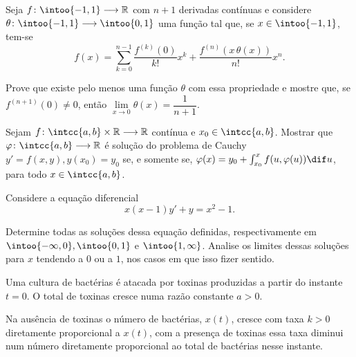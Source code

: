 \documentclass{IMTexam}
\begin{document}
\begin{questions}
\begin{parts}
\begin{solution}
                \hfill\qedsymbol
            \end{solution}
        \end{parts}

        \question Seja $f\colon \intoo{-1,1}\longrightarrow \mathbb{R}$ com
        $n+1$ derivadas contínuas e considere
        $\theta\colon\intoo{-1,1}\longrightarrow\intoo{0,1}$ uma função tal que,
        se $x\in\intoo{-1,1}$, tem-se
        \[ f(x)=\sum_{k=0}^{n-1}\dfrac{f^{(k)}(0)}{k!}x^k+\dfrac{f^{(n)}(x\,\theta(x))}{n!}x^n. \]

        Prove que existe pelo menos uma função $\theta$ com essa propriedade e
        mostre que, se $f^{(n+1)}(0)\neq 0$, então
        $\lim\limits_{x\to0}\theta(x)=\dfrac{1}{n+1}$.

        \begin{solution}
        \end{solution}

        \question Sejam $f\colon \intcc{a,b}\times\mathbb{R}\longrightarrow
        \mathbb{R}$ contínua e $x_0\in\intcc{a,b}$. Mostrar que
        $\varphi\colon\intcc{a,b}\longrightarrow\mathbb{R}$ é solução do
        problema de Cauchy $y'=f(x,y), y(x_0)=y_0$ se, e somente se,
        $\varphi(x)=y_0+\int_{x_0}^x f(u,\varphi(u))\dif u$, para todo
        $x\in\intcc{a,b}$.

        \begin{solution}
        \end{solution}

        \question Considere a equação diferencial
        \[ x(x-1)y'+y=x^2-1. \]

        Determine todas as soluções dessa equação definidas, respectivamente em
        $\intoo{-\infty,0}, \intoo{0,1}$ e $\intoo{1,\infty}$. Analise os
        limites dessas soluções para $x$ tendendo a $0$ ou a $1$, nos casos em
        que isso fizer sentido.

        \begin{solution}
        \end{solution}

        \question Uma cultura de bactérias é atacada por toxinas produzidas a
        partir do instante $t=0$. O total de toxinas cresce numa razão constante
        $a>0$.

        Na ausência de toxinas o número de bactérias, $x(t)$, cresce com taxa
        $k>0$ diretamente proporcional a $x(t)$, com a presença de toxinas essa
        taxa diminui num número diretamente proporcional ao total de bactérias
        nesse instante.


\end{questions}
\end{document}
